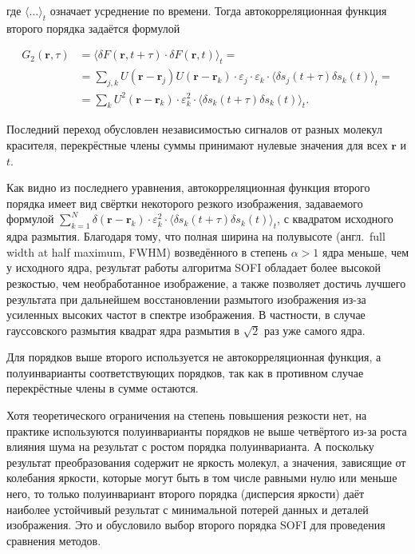 \noindent где $\langle \ldots \rangle_t$ означает усреднение по времени. Тогда автокорреляционная функция второго порядка задаётся формулой

\begin{align*}
	G_2\left(\mathbf{r},\tau\right) &= \langle \delta F\left(\mathbf{r},t+\tau\right)\cdot\delta F\left(\mathbf{r},t\right) \rangle_t = \\
	&= \sum_{j,k} {U\left(\mathbf{r}-\mathbf{r}_j\right)U\left(\mathbf{r}-\mathbf{r}_k\right)\cdot\varepsilon_j\cdot\varepsilon_k\cdot \langle \delta s_j\left(t+\tau\right)\delta s_k\left(t\right) \rangle_t} = \\
	&= \sum_{k} {U^2\left(\mathbf{r}-\mathbf{r}_k\right)\cdot\varepsilon_k^2\cdot \langle \delta s_k\left(t+\tau\right)\delta s_k\left(t\right) \rangle_t}.
\end{align*}

Последний переход обусловлен независимостью сигналов от разных молекул красителя, перекрёстные члены суммы принимают нулевые значения для всех $\mathbf{r}$ и $t$.

Как видно из последнего уравнения, автокорреляционная функция второго порядка имеет вид свёртки некоторого резкого изображения, задаваемого формулой $\sum_{k=1}^{N} {\delta(\mathbf{r}-\mathbf{r}_k)\cdot\varepsilon_k^2\cdot \langle \delta s_k\left(t+\tau\right)\delta s_k\left(t\right) \rangle_t}$, с квадратом исходного ядра размытия. Благодаря тому, что полная ширина на полувысоте (англ.~full width at half maximum, FWHM) возведённого в степень $\alpha>1$ ядра меньше, чем у исходного ядра, результат работы алгоритма SOFI обладает более высокой резкостью, чем необработанное изображение, а также позволяет достичь лучшего результата при дальнейшем восстановлении размытого изображения из-за усиленных высоких частот в спектре изображения. В частности, в случае гауссовского размытия квадрат ядра размытия в $\sqrt{2}$ раз уже самого ядра.

Для порядков выше второго используется не автокорреляционная функция, а полуинварианты соответствующих порядков, так как в противном случае перекрёстные члены в сумме остаются.

Хотя теоретического ограничения на степень повышения резкости нет, на практике используются полуинварианты порядков не выше четвёртого из-за роста влияния шума на результат с ростом порядка полуинварианта. А поскольку результат преобразования содержит не яркость молекул, а значения, зависящие от колебания яркости, которые могут быть в том числе равными нулю или меньше него, то только полуинвариант второго порядка (дисперсия яркости) даёт наиболее устойчивый результат с минимальной потерей данных и деталей изображения. Это и обусловило выбор второго порядка SOFI для проведения сравнения методов.

